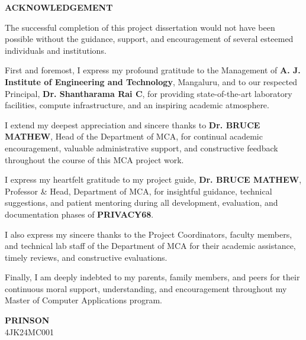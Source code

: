 \documentclass[12pt,letterpaper,oneside]{report}
\newcommand{\studentname}{PRINSON}
\newcommand{\studentusn}{4JK24MC001} %
\newcommand{\guidename}{Dr. BRUCE MATHEW}
\newcommand{\guidedesignation}{Professor \& Head, Department of MCA}
\newcommand{\hodname}{Dr. BRUCE MATHEW}
\newcommand{\principalname}{Dr. Shantharama Rai C}
\newcommand{\institution}{A. J. Institute of Engineering and Technology}
\newcommand{\department}{Department of MCA}
\newcommand{\frontheading}[1]{%
  \begin{center}\bfseries\fontsize{15}{19}\selectfont #1\end{center}
  \vspace{1cm}
}
\begin{document}
\clearpage
\frontheading{ACKNOWLEDGEMENT}
\noindent The successful completion of this project dissertation would not have been possible without the guidance, support, and encouragement of several esteemed individuals and institutions.

\par\medskip
\noindent First and foremost, I express my profound gratitude to the Management of \textbf{\institution}, Mangaluru, and to our respected Principal, \textbf{\principalname}, for providing state-of-the-art laboratory facilities, compute infrastructure, and an inspiring academic atmosphere.

\par\medskip
\noindent I extend my deepest appreciation and sincere thanks to \textbf{\hodname}, Head of the \department, for continual academic encouragement, valuable administrative support, and constructive feedback throughout the course of this MCA project work.

\par\medskip
\noindent I express my heartfelt gratitude to my project guide, \textbf{\guidename}, \guidedesignation, for insightful guidance, technical suggestions, and patient mentoring during all development, evaluation, and documentation phases of \textbf{PRIVACY68}.

\par\medskip
\noindent I also express my sincere thanks to the Project Coordinators, faculty members, and technical lab staff of the Department of MCA for their academic assistance, timely reviews, and constructive evaluations.

\par\medskip
\noindent Finally, I am deeply indebted to my parents, family members, and peers for their continuous moral support, understanding, and encouragement throughout my Master of Computer Applications program.

\vfill
\begin{flushright}
\textbf{\studentname}\\
\studentusn
\end{flushright}
\end{document}
